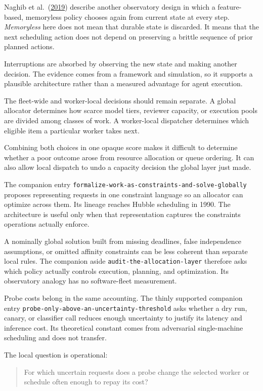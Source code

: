 Naghib et al.~(\href{https://arxiv.org/abs/1810.04815}{2019}) describe another observatory design in which a feature-based, memoryless policy chooses again from current state at every step. \emph{Memoryless} here does not mean that durable state is discarded. It means that the next scheduling action does not depend on preserving a brittle sequence of prior planned actions.

Interruptions are absorbed by observing the new state and making another decision. The evidence comes from a framework and simulation, so it supports a plausible architecture rather than a measured advantage for agent execution.

The fleet-wide and worker-local decisions should remain separate. A global allocator determines how scarce model tiers, reviewer capacity, or execution pools are divided among classes of work. A worker-local dispatcher determines which eligible item a particular worker takes next.

Combining both choices in one opaque score makes it difficult to determine whether a poor outcome arose from resource allocation or queue ordering. It can also allow local dispatch to undo a capacity decision the global layer just made.

The companion entry \texttt{formalize-work-as-constraints-and-solve-globally} proposes representing requests in one constraint language so an allocator can optimize across them. Its lineage reaches Hubble scheduling in 1990. The architecture is useful only when that representation captures the constraints operations actually enforce.

A nominally global solution built from missing deadlines, false independence assumptions, or omitted affinity constraints can be less coherent than separate local rules. The companion aside \texttt{audit-the-allocation-layer} therefore asks which policy actually controls execution, planning, and optimization. Its observatory analogy has no software-fleet measurement.

Probe costs belong in the same accounting. The thinly supported companion entry \texttt{probe-only-above-an-uncertainty-threshold} asks whether a dry run, canary, or classifier call reduces enough uncertainty to justify its latency and inference cost. Its theoretical constant comes from adversarial single-machine scheduling and does not transfer.

The local question is operational:

\begin{quote}
For which uncertain requests does a probe change the selected worker or schedule often enough to repay its cost?
\end{quote}


